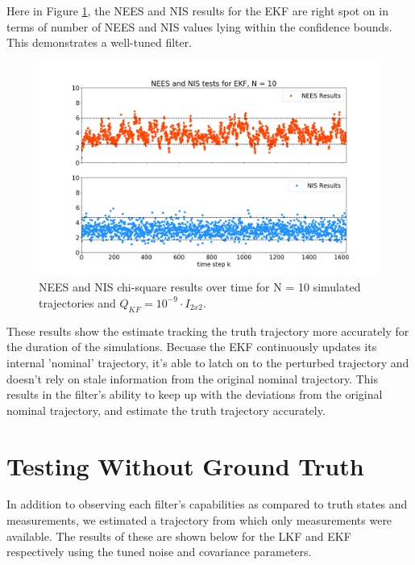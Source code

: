 \documentclass[11pt, a4paper]{article}
\begin{document}
Here in Figure \ref{fig:neesnis_ekf}, the NEES and NIS results for the EKF are right spot on in terms of number of NEES and NIS values lying within the confidence bounds. 
This demonstrates a well-tuned filter. 
\begin{figure}[H]
	\centering
	\includegraphics[width=\textwidth]{./Figures/NEESNIS_ekf_N10Q1.0E-09.png}
	\caption{NEES and NIS chi-square results over time for N = 10 simulated trajectories and $Q_{KF} = 10^{-9} \cdot I_{2 x 2}$.}
	\label{fig:neesnis_ekf}
\end{figure}

These results show the estimate tracking the truth trajectory more accurately for the duration of the simulations. 
Becuase the EKF continuously updates its internal 'nominal' trajectory, it's able to latch on to the perturbed trajectory and doesn't rely on stale information from the original nominal trajectory. 
This results in the filter's ability to keep up with the deviations from the original nominal trajectory, and estimate the truth trajectory accurately.


\section{Testing Without Ground Truth}
In addition to observing each filter's capabilities as compared to truth states and measurements, we estimated a trajectory from which only measurements were available. 
The results of these  are shown below for the LKF and EKF respectively using the tuned noise and covariance parameters. 
\end{document}
